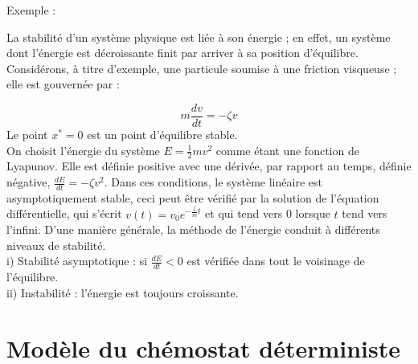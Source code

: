 \documentclass[12pt,a4paper]{report}%
\newcounter{PP}[chapter]
\newenvironment{exemple}[2][]
  {\refstepcounter{PP}
  \begin{bclogo}[
    logo=\bccrayon , %
    couleur=white,
    arrondi=0.1,
    barre =snake,
     tailleOndu = 1.5,
    couleurBord=white,#1]{Exemple \thePP:#2}
  }
  {\end{bclogo}}
\begin{document}
\begin{exemple}{}
	La stabilité d'un système physique est liée à son énergie ; en effet, un système dont l'énergie est décroissante finit par arriver à sa position d'équilibre. Considérons, à titre d'exemple, une particule soumise à une friction visqueuse ; elle est gouvernée par :
	
	\[ m \frac{dv}{dt} = -\zeta v \]
	Le point $x^*=0$ est un point d'équilibre stable.\\ 
	On choisit l'énergie du système \( E = \frac{1}{2}mv^2 \) comme étant une fonction de Lyapunov. Elle est définie positive avec une dérivée, par rapport au temps, définie négative, \( \frac{dE}{dt} = -\zeta v^2 \). Dans ces conditions, le système linéaire est asymptotiquement stable, ceci peut être vérifié par la solution de l'équation différentielle, qui s'écrit \( v(t) = v_0 e^{-\frac{\zeta}{m} t} \) et qui tend vers 0 lorsque \( t \) tend vers l'infini. D'une manière générale, la méthode de l'énergie conduit à différents niveaux de stabilité.\\
	i) Stabilité asymptotique : si \( \frac{dE}{dt} < 0 \) est vérifiée dans tout le voisinage de l'équilibre.\\
	ii) Instabilité : l'énergie est toujours croissante.
	
\end{exemple}
\chapter{Modèle du chémostat déterministe} 
\end{document}
